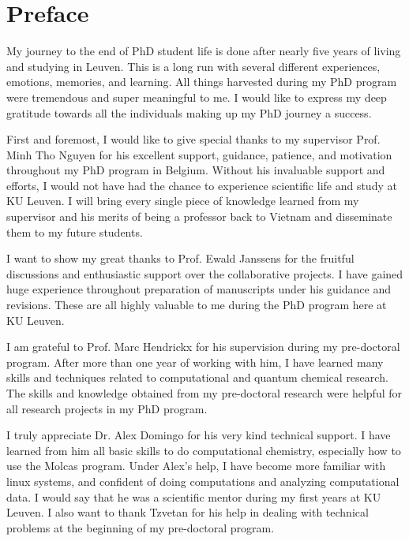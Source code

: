 
\chapter*{Preface}                                  \label{ch:preface}

My journey to the end of PhD student life is done after nearly five years of living and studying in Leuven. This is a long run with several different experiences, emotions, memories, and learning. All things harvested during my PhD program were tremendous and super meaningful to me. I would like to express my deep gratitude towards all the individuals making up my PhD journey a success.   


First and foremost, I would like to give special thanks to my supervisor Prof. Minh Tho Nguyen for his excellent support, guidance, patience, and motivation throughout my PhD program in Belgium. Without his invaluable support and efforts, I would not have had the chance to experience scientific life and study at KU Leuven. I will bring every single piece of knowledge learned from my supervisor and his merits of being a professor back to Vietnam and disseminate them to my future students.


I want to show my great thanks to Prof. Ewald Janssens for the fruitful discussions and enthusiastic support over the collaborative projects. I have gained huge experience throughout preparation of manuscripts under his guidance and revisions. These are all highly valuable to me during the PhD program here at KU Leuven.


I am grateful to Prof. Marc Hendrickx for his supervision during my pre-doctoral program. After more than one year of working with him, I have learned many skills and techniques related to computational and quantum chemical research. The skills and knowledge obtained from my pre-doctoral research were helpful for all research projects in my PhD program. 


I truly appreciate Dr. Alex Domingo for his very kind technical support. I have learned from him all basic skills to do computational chemistry, especially how to use the Molcas program. Under Alex's help, I have become more familiar with linux systems, and confident of doing computations and analyzing computational data. I would say that he was a scientific mentor during my first years at KU Leuven.  I also want to thank Tzvetan for his help in dealing with technical problems at the beginning of my pre-doctoral program.


